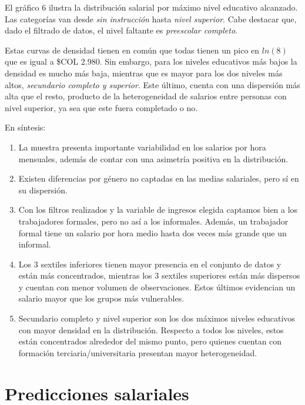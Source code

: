 \documentclass[11pt,oneside]{article}
\begin{document}
	El gráfico 6 ilustra la distribución salarial por máximo nivel educativo alcanzado. Las categorías van desde \textit{sin instrucción} hasta \textit{nivel superior}. Cabe destacar que, dado el filtrado de datos, el nivel faltante es \textit{preescolar completo}.
	
	
	Estas curvas de densidad tienen en común que todas tienen un pico en $ln(8)$ que es igual a \$COL 2.980. Sin embargo, para los niveles educativos más bajos la densidad es mucho más baja, mientras que es mayor para los dos niveles más altos, \textit{secundario completo y superior}. Este último, cuenta con una dispersión más alta que el resto, producto de la heterogeneidad de salarios entre personas con nivel superior, ya sea que este fuera completado o no. 
	
	En síntesis:
	\begin{enumerate}
		\item La muestra presenta importante variabilidad en los salarios por hora mensuales, además de contar con una asimetría positiva en la distribución.
		\item Existen diferencias por género no captadas en las medias salariales, pero sí en su dispersión.
		\item Con los filtros realizados y la variable de ingresos elegida captamos bien a los trabajadores formales, pero no así a los informales. Además, un trabajador formal tiene un salario por hora medio hasta dos veces más grande que un informal. 
		\item Los 3 sextiles inferiores tienen mayor presencia en el conjunto de datos y están más concentrados, mientras los 3 sextiles superiores están más dispersos y cuentan con menor volumen de observaciones. Estos últimos evidencian un salario mayor que los grupos más vulnerables.
		\item Secundario completo y nivel superior son los dos máximos niveles educativos con mayor densidad en la distribución. Respecto a todos los niveles, estos están concentrados alrededor del mismo punto, pero quienes cuentan con formación terciaria/universitaria presentan mayor heterogeneidad. 
	\end{enumerate}
	
	\newpage
	
	
	
	\section{Predicciones salariales}
	
\end{document}
